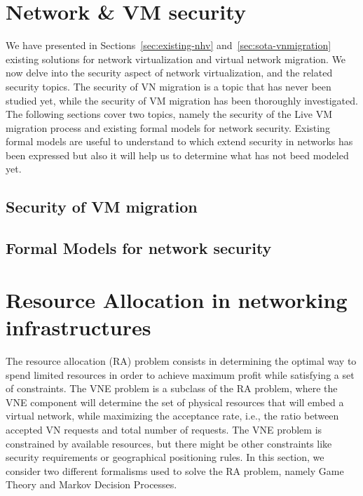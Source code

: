 \documentclass[a4paper, 11pt]{report}
\newcommand{\ie}{i.e.,\xspace}
\theoremstyle{definition}
\begin{document}














\newpage
\section{Network \& VM security}

We have presented in Sections~\ref{sec:existing-nhv} and~\ref{sec:sota-vnmigration} existing solutions for network virtualization and virtual network migration. We now delve into the security aspect of network virtualization, and the related security topics. The security of VN migration is a topic that has never been  studied yet, while the security of VM migration has been thoroughly investigated. The following sections cover two topics, namely the security of the Live VM migration process and existing formal models for network security.
Existing formal models are useful to understand to which extend security in networks has been expressed but also it will help us to determine what has not beed modeled yet.

\subsection{Security of VM migration}



\subsection{Formal Models for network security}



\newpage
\section{Resource Allocation in networking infrastructures}
The resource allocation (RA) problem consists in determining the optimal way to spend limited resources in order to achieve maximum profit while satisfying a set of constraints.
The VNE problem is a subclass of the RA problem, where the VNE component will determine the set of physical resources that will embed a virtual network, while maximizing the acceptance rate, \ie the ratio between accepted VN requests and total number of requests.
The VNE problem is constrained by available resources, but there might be other constraints like security requirements or geographical positioning rules.
In this section, we consider two different formalisms used to solve the RA problem, namely Game Theory and Markov Decision Processes. 
\end{document}
